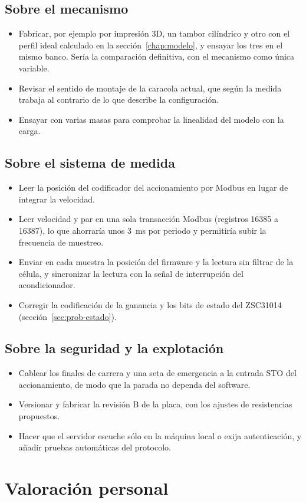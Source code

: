 \subsection{Sobre el mecanismo}
\begin{itemize}
  \item Fabricar, por ejemplo por impresión 3D, un tambor cilíndrico y otro con el perfil ideal
        calculado en la sección~\ref{chap:modelo}, y ensayar los tres en el mismo banco. Sería la
        comparación definitiva, con el mecanismo como única variable.
  \item Revisar el sentido de montaje de la caracola actual, que según la medida trabaja al contrario
        de lo que describe la configuración.
  \item Ensayar con varias masas para comprobar la linealidad del modelo con la carga.
\end{itemize}

\subsection{Sobre el sistema de medida}
\begin{itemize}
  \item Leer la posición del codificador del accionamiento por Modbus en lugar de integrar la
        velocidad.
  \item Leer velocidad y par en una sola transacción Modbus (registros 16385 a 16387), lo que
        ahorraría unos \SI{3}{\milli\second} por periodo y permitiría subir la frecuencia de muestreo.
  \item Enviar en cada muestra la posición del firmware y la lectura sin filtrar de la célula, y
        sincronizar la lectura con la señal de interrupción del acondicionador.
  \item Corregir la codificación de la ganancia y los bits de estado del ZSC31014
        (sección~\ref{sec:prob-estado}).
\end{itemize}

\subsection{Sobre la seguridad y la explotación}
\begin{itemize}
  \item Cablear los finales de carrera y una seta de emergencia a la entrada STO del accionamiento,
        de modo que la parada no dependa del software.
  \item Versionar y fabricar la revisión B de la placa, con los ajustes de resistencias propuestos.
  \item Hacer que el servidor escuche sólo en la máquina local o exija autenticación, y añadir
        pruebas automáticas del protocolo.
\end{itemize}

\section{Valoración personal}

